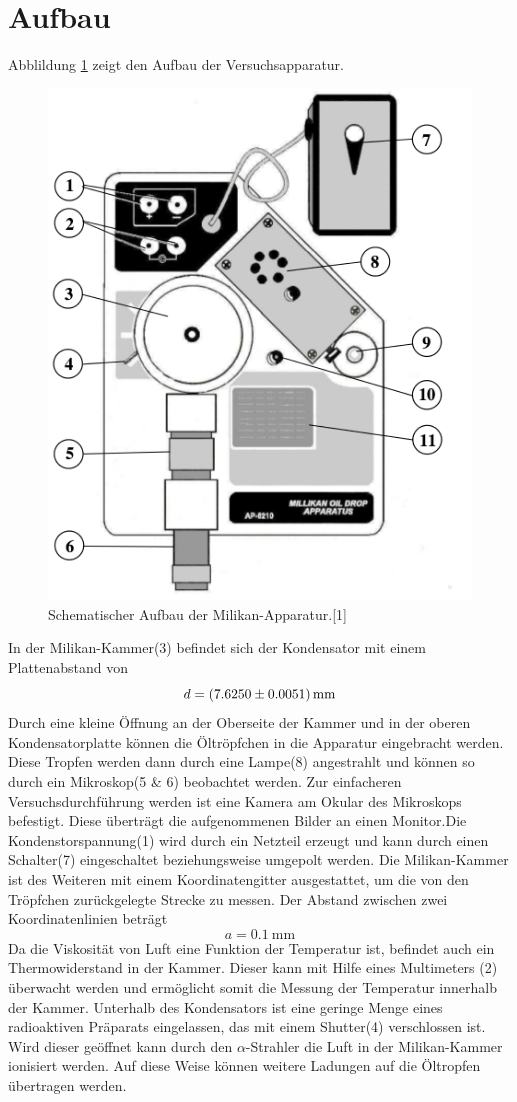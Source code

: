\documentclass[11pt,ngerman,a4paper]{article}
\begin{document}
\section{Aufbau}
Abblildung \ref{aufbau} zeigt den Aufbau der Versuchsapparatur.

\begin{figure}[htp]
\centering
\includegraphics[scale=0.50]{abb2.png}
\caption{Schematischer Aufbau der Milikan-Apparatur.[1]}
\label{aufbau}
\end{figure}

\noindent
 In der Milikan-Kammer(3) befindet sich der Kondensator mit einem Plattenabstand von
\[
d = \SI{7.6250+-0.0051}{\milli\meter}
\]
Durch eine kleine Öffnung an der Oberseite der Kammer und in der oberen Kondensatorplatte können die Öltröpfchen in die Apparatur eingebracht werden. Diese Tropfen werden dann durch eine Lampe(8) angestrahlt und können so durch ein Mikroskop(5 \& 6) beobachtet werden. Zur einfacheren Versuchsdurchführung werden ist eine Kamera am Okular des Mikroskops befestigt. Diese überträgt die aufgenommenen Bilder an einen Monitor.Die Kondenstorspannung(1) wird durch ein Netzteil erzeugt und kann durch einen Schalter(7) eingeschaltet beziehungsweise umgepolt werden. 
Die Milikan-Kammer ist des Weiteren mit einem Koordinatengitter ausgestattet, um die von den Tröpfchen zurückgelegte Strecke zu messen. Der Abstand zwischen zwei Koordinatenlinien beträgt
\[
a = \SI{0.1}{\milli\meter}
\]
Da die Viskosität von Luft eine Funktion der Temperatur ist, befindet auch ein Thermowiderstand in der Kammer. Dieser kann mit Hilfe eines Multimeters (2) überwacht werden und ermöglicht somit die Messung der Temperatur innerhalb der Kammer. Unterhalb des Kondensators ist eine geringe Menge eines radioaktiven Präparats eingelassen, das mit einem Shutter(4) verschlossen ist. Wird dieser geöffnet kann durch den $\alpha$-Strahler die Luft in der Milikan-Kammer ionisiert werden. Auf diese Weise können weitere Ladungen auf die Öltropfen übertragen werden.
\end{document}
